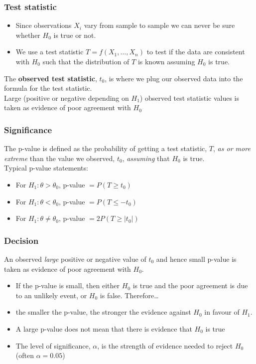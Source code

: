 \documentclass[a4paper]{article}
\begin{document}
\subsubsection{Test statistic}
\begin{itemize}
	\item Since observations \( X_i \) vary from sample to sample we can never be sure whether \( H_0 \) is true or not.
	\item We use a test statistic \( T = f(X_1,\dotsc,X_n) \) to test if the data are consistent with \( H_0 \) such that the distribution of \( T \) is known assuming \( H_0 \) is true.
\end{itemize}
The \textbf{observed test statistic}, \( t_0 \), is where we plug our observed data into the formula for the test statistic.\\
Large (positive or negative depending on \( H_1 \)) observed test statistic values is taken as evidence of poor agreement with \( H_0 \)
\subsubsection{Significance}
The p-value is defined as the probability of getting a test statistic, \( T \), \textit{as or more extreme} than the value we observed, \( t_0 \), \textit{assuming} that \( H_0 \) is true.\\
Typical p-value statements:
\begin{itemize}
	\item For \( H_1: \theta > \theta_0 \), p-value \( = P(T \geq t_0) \) 
	\item For \( H_1: \theta < \theta_0 \), p-value \( = P(T \leq -t_0) \) 
	\item For \( H_1: \theta \neq \theta_0 \), p-value \( = 2P(T \geq \lvert t_0 \rvert) \) 
\end{itemize}
\subsubsection{Decision}
An observed \textit{large} positive or negative value of \( t_0 \) and hence small p-value is taken as evidence of poor agreement with \( H_0 \).
\begin{itemize}
	\item If the p-value is small, then either \( H_0 \) is true and the poor agreement is due to an unlikely event, or \( H_0 \) is false. Therefore\dots
	\item the smaller the p-value, the stronger the evidence against \( H_0 \) in favour of \( H_1 \).
	\item A large p-value does not mean that there is evidence that \( H_0 \) is true
	\item The level of significance, \( \alpha \), is the strength of evidence needed to reject \( H_0 \) (often \( \alpha = 0.05 \))
\end{itemize}
\end{document}
